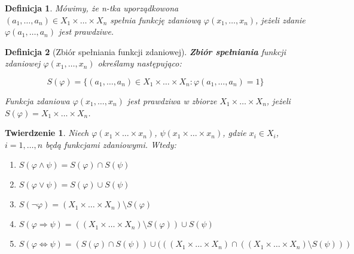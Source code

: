 \documentclass[a5paper,8pt]{article}
\newtheorem{definition}{Definicja}[section]
\newtheorem{theorem}{Twierdzenie}[section]
\begin{document}
        \begin{definition}
            Mówimy, że n-tka uporządkowona \\
            $ (a_1, \ldots, a_n) \in X_1 \times \ldots \times X_n $ spełnia funkcję zdaniową $ \varphi (x_1, \ldots, x_n) $, jeżeli zdanie $ \varphi (a_1, \ldots, a_n) $ jest prawdziwe.
        \end{definition}

        \begin{definition}[Zbiór spełniania funkcji zdaniowej]
            \textbf{Zbiór spełniania} funkcji zdaniowej $ \varphi (x_1, \ldots, x_n) $ określamy następująco:

            \begin{equation*}
                S(\varphi) = \{ (a_1, \ldots, a_n) \in X_1 \times \ldots \times X_n : \varphi (a_1, \ldots, a_n) = 1 \}
            \end{equation*}

            Funkcja zdaniowa $ \varphi (x_1, \ldots, x_n) $ jest prawdziwa w zbiorze $ X_1 \times \ldots \times X_n $, jeżeli $ S(\varphi) = X_1 \times \ldots \times X_n $.

        \end{definition}
        
        \begin{theorem}
            Niech $ \varphi(x_1 \times \ldots \times x_n) $, $ \psi(x_1 \times \ldots \times x_n) $, gdzie $ x_i \in X_i $, $ i = 1, \ldots, n $ będą funkcjami zdaniowymi. Wtedy:

            \begin{enumerate}[label=\textbf{\arabic*})]
                \item $ S( \varphi \wedge \psi ) = S( \varphi ) \cap S( \psi ) $
                \item $ S( \varphi \vee \psi ) = S( \varphi ) \cup S( \psi ) $
                \item $ S( \neg \varphi ) = (X_1 \times \ldots \times X_n ) \setminus S( \varphi ) $
                \item $ S( \varphi \Rightarrow \psi ) = (( X_1 \times \ldots \times X_n ) \setminus S( \varphi ) ) \cup S( \psi ) $
                \item $ S( \varphi \Leftrightarrow \psi ) = ( S( \varphi ) \cap S( \psi ) ) \cup ( ( ( X_1 \times \ldots \times X_n ) \cap ( ( X_1 \times \ldots \times X_n ) \setminus S( \psi ) ) ) $%
            \end{enumerate}

        \end{theorem}
\end{document}
